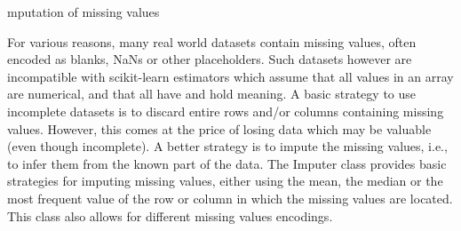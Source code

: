 mputation of missing values

For various reasons, many real world datasets contain missing values, often encoded as blanks, NaNs or other placeholders. Such datasets however are incompatible with scikit-learn estimators which assume that all values in an array are numerical, and that all have and hold meaning. A basic strategy to use incomplete datasets is to discard entire rows and/or columns containing missing values. However, this comes at the price of losing data which may be valuable (even though incomplete). A better strategy is to impute the missing values, i.e., to infer them from the known part of the data.
The Imputer class provides basic strategies for imputing missing values, either using the mean, the median or the most frequent value of the row or column in which the missing values are located. This class also allows for different missing values encodings.
